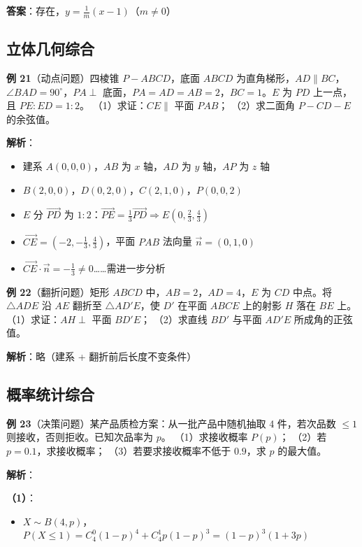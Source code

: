 \textbf{答案}：存在，$y=\frac1m(x-1)$（$m\neq0$）

\subsection{立体几何综合}

\textbf{例 21}（动点问题）四棱锥 $P-ABCD$，底面 $ABCD$ 为直角梯形，$AD\parallel BC$，$\angle BAD=90^\circ$，$PA\perp$ 底面，$PA=AD=AB=2$，$BC=1$。$E$ 为 $PD$ 上一点，且 $PE:ED=1:2$。
（1）求证：$CE\parallel$ 平面 $PAB$；
（2）求二面角 $P-CD-E$ 的余弦值。

\textbf{解析}：
\begin{itemize}
  \item 建系 $A(0,0,0)$，$AB$ 为 $x$ 轴，$AD$ 为 $y$ 轴，$AP$ 为 $z$ 轴
  \item $B(2,0,0)$，$D(0,2,0)$，$C(2,1,0)$，$P(0,0,2)$
  \item $E$ 分 $\overrightarrow{PD}$ 为 $1:2$：$\overrightarrow{PE}=\frac13\overrightarrow{PD} \Rightarrow E(0,\frac23,\frac43)$
  \item $ \overrightarrow{CE}=(-2,-\frac13,\frac43)$，平面 $PAB$ 法向量 $\vec{n}=(0,1,0)$
  \item $\overrightarrow{CE}\cdot\vec{n}=-\frac13\neq0$……需进一步分析
\end{itemize}

\textbf{例 22}（翻折问题）矩形 $ABCD$ 中，$AB=2$，$AD=4$，$E$ 为 $CD$ 中点。将 $\triangle ADE$ 沿 $AE$ 翻折至 $\triangle AD'E$，使 $D'$ 在平面 $ABCE$ 上的射影 $H$ 落在 $BE$ 上。
（1）求证：$AH\perp$ 平面 $BD'E$；
（2）求直线 $BD'$ 与平面 $AD'E$ 所成角的正弦值。

\textbf{解析}：略（建系 + 翻折前后长度不变条件）

\subsection{概率统计综合}

\textbf{例 23}（决策问题）某产品质检方案：从一批产品中随机抽取 4 件，若次品数 $\le1$ 则接收，否则拒收。已知次品率为 $p$。
（1）求接收概率 $P(p)$；
（2）若 $p=0.1$，求接收概率；
（3）若要求接收概率不低于 $0.9$，求 $p$ 的最大值。

\textbf{解析}：

\textbf{（1）}：
\begin{itemize}
  \item $X\sim B(4,p)$，$P(X\le1)=C_4^0(1-p)^4 + C_4^1p(1-p)^3 = (1-p)^3(1+3p)$
\end{itemize}

